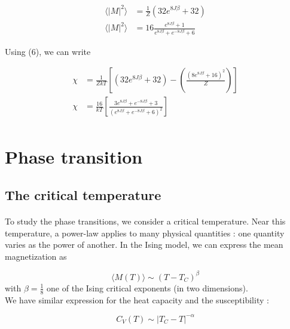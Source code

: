 \documentclass[a4paper, twoside, 11pt]{report}
\theoremstyle{theorem}
\theoremstyle{remark}
\theoremstyle{exemple}
\begin{document}
                \begin{align*}
                    \langle |M|^2 \rangle &= \frac{1}{Z}\left( 32e^{8J\beta} + 32 \right) \tag{9}\\
                    \langle |M|^2 \rangle &= 16 \frac{e^{8J\beta}+1}{e^{8J\beta} + e^{-8J\beta} + 6}
                \end{align*}
                
            Using (6), we can write
            
                \begin{align*}
                    \chi &= \frac{1}{ZkT}\left[\left(32e^{8J\beta}+32\right)-\left(\frac{(8e^{8J\beta}+16)^2}{Z}\right)\right] \tag{10}\\
                    \chi &= \frac{16}{kT}\left[\frac{3e^{8J\beta}+e^{-8J\beta}+3}{(e^{8J\beta}+e^{-8J\beta}+6)^2}\right] \\
                \end{align*}            
            

    \section{Phase transition}
    
        \subsection{The critical temperature}
        
            \paragraph{}To study the phase transitions, we consider a critical temperature. Near this temperature, a power-law applies to many physical quantities : one quantity varies as the power of another. In the Ising model, we can express the mean magnetization as 
                
                \begin{equation*}
                    \langle M(T)\rangle \sim (T-T_C)^{\beta}
                \end{equation*}
            with $\beta = \frac{1}{8}$ one of the Ising critical exponents (in two dimensions).\\
            We have similar expression for the heat capacity and the susceptibility : 
            
                \begin{equation*}
                    C_V(T) \sim |T_C - T | ^{-\alpha}
                \end{equation*}
                
\end{document}
